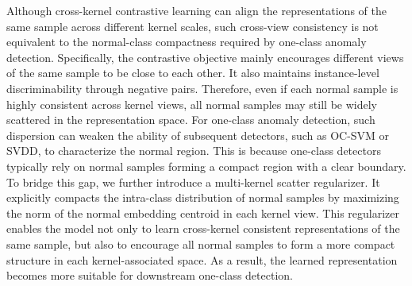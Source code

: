 \documentclass[times, review, 10pt]{elsarticle}
\begin{document}
Although cross-kernel contrastive learning can align the representations of the same sample across different kernel scales, such cross-view 
consistency is not equivalent to the normal-class compactness required by one-class anomaly detection. Specifically, the contrastive 
objective mainly encourages different views of the same sample to be close to each other. It also maintains instance-level discriminability 
through negative pairs. Therefore, even if each normal sample is highly consistent across kernel views, all normal samples may still be 
widely scattered in the representation space.
For one-class anomaly detection, such dispersion can weaken the ability of subsequent detectors, such as OC-SVM or SVDD, to characterize 
the normal region. This is because one-class detectors typically rely on normal samples forming a compact region with a clear boundary. 
To bridge this gap, we further introduce a multi-kernel scatter regularizer. It explicitly 
compacts the intra-class distribution of normal samples by maximizing the norm of the normal embedding centroid in each kernel view. This 
regularizer enables the model not only to learn cross-kernel consistent representations of the same sample, but also to encourage all 
normal samples to form a more compact structure in each kernel-associated space. As a result, the learned representation becomes more 
suitable for downstream one-class detection.
\end{document}
